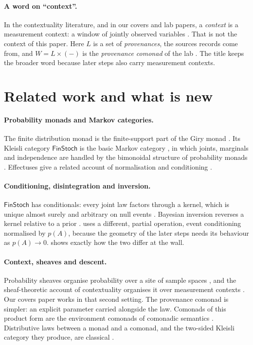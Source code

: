 \documentclass[11pt]{article}
\theoremstyle{definition}\newtheorem{definition}[theorem]{Definition}\newtheorem{remark}[theorem]{Remark}\newtheorem{example}[theorem]{Example}
\begin{document}
\paragraph{A word on ``context''.} In the contextuality literature, and in our covers and lab papers, a \emph{context} is a measurement
context: a window of jointly observed variables \cite{AbramskyBrandenburger2011}. That is not the context of this paper. Here $L$ is a set of
\emph{provenances}, the sources records come from, and $W=L\times(-)$ is the \emph{provenance comonad} of the lab
\cite[Section ``sources'']{Lab}. The title keeps the broader word because later steps also carry measurement contexts.

\section{Related work and what is new}\label{sec:related}
\paragraph{Probability monads and Markov categories.} The finite distribution monad is the finite-support part of the Giry monad
\cite{Giry1982}. Its Kleisli category $\mathsf{FinStoch}$ is the basic Markov category \cite{Fritz2020}, in which joints, marginals and
independence are handled by the bimonoidal structure of probability monads \cite{FritzPerrone2018}. Effectuses give a related account of
normalisation and conditioning \cite{Jacobs2018}.

\paragraph{Conditioning, disintegration and inversion.} $\mathsf{FinStoch}$ has conditionals: every joint law factors through a kernel,
which is unique almost surely and arbitrary on null events \cite{Fritz2020}. Bayesian inversion reverses a kernel relative to a prior
\cite{ChoJacobs2019}.  uses a different, partial operation, event conditioning normalised by $p(A)$, because the geometry of the
later steps needs its behaviour as $p(A)\to0$.  shows exactly how the two differ at the wall.

\paragraph{Context, sheaves and descent.} Probability sheaves organise probability over a site of sample spaces \cite{Simpson2017}, and the
sheaf-theoretic account of contextuality organises it over measurement contexts \cite{AbramskyBrandenburger2011}. Our covers paper works
in that second setting. The provenance comonad is simpler: an explicit parameter carried alongside the law. Comonads of this product
form are the environment comonads of comonadic semantics \cite{UustaluVene2008}. Distributive laws between a monad and a comonad, and the
two-sided Kleisli category they produce, are classical \cite{BrookesVanStone1993,PowerWatanabe2002}.
\end{document}
